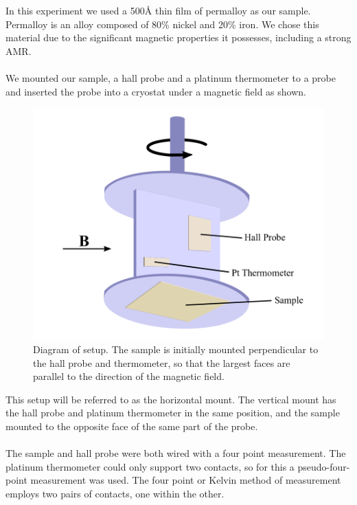 \documentclass[10pt, twocolumn]{revtex4}
\begin{document}
In this experiment we used a 500\AA{} thin film of permalloy as our sample. Permalloy is an alloy composed of 80\% nickel and 20\% iron. We chose this material due to the significant magnetic properties it possesses, including a strong AMR. \\
\\
We mounted our sample, a hall probe and a platinum thermometer to a probe and inserted the probe into a cryostat under a magnetic field as shown.

\begin{figure}[H]
	\centering
	\includegraphics[width = \columnwidth]{drawing.png}
	\caption{Diagram of setup.  The sample is initially mounted perpendicular to the hall probe and thermometer, so that the largest faces are parallel to the direction of the magnetic field.}
	\label{fig:setup1}
\end{figure}

This setup will be referred to as the horizontal mount. The vertical mount has the hall probe and platinum thermometer in the same position, and the sample mounted to the opposite face of the same part of the probe.\\
\\
The sample and hall probe were both wired with a four point measurement. The platinum thermometer could only support two contacts, so for this a pseudo-four-point measurement was used. The four point or Kelvin method of measurement employs two pairs of contacts, one within the other. 
\end{document}
